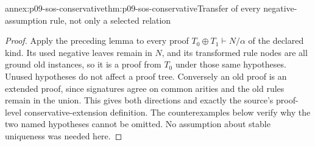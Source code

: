 \begin{annexitem}{annex:p09-sos-conservative}{thm:p09-sos-conservative}{Transfer of every negative-assumption rule, not only a selected relation}
\begin{proof}
Apply the preceding lemma to every proof
\(T_0\oplus T_1\vdash N/\alpha\) of the declared kind.
Its used negative leaves remain in \(N\), and its transformed
rule nodes are all ground old instances, so it is a proof from
\(T_0\) under those same hypotheses. Unused hypotheses do
not affect a proof tree. Conversely an old proof is an extended
proof, since signatures agree on common arities and the old rules
remain in the union. This gives both directions and exactly the
source's proof-level conservative-extension definition. The
counterexamples below verify why the two named hypotheses cannot
be omitted. No assumption about stable uniqueness was needed here.
\end{proof}
\end{annexitem}

